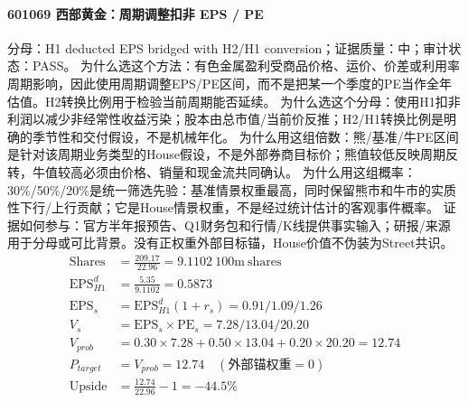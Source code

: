 \paragraph{601069 西部黄金：周期调整扣非 EPS / PE}
分母：H1 deducted EPS bridged with H2/H1 conversion；证据质量：中；审计状态：PASS。
为什么选这个方法：有色金属盈利受商品价格、运价、价差或利用率周期影响，因此使用周期调整EPS/PE区间，而不是把某一个季度的PE当作全年估值。H2转换比例用于检验当前周期能否延续。
为什么选这个分母：使用H1扣非利润以减少非经常性收益污染；股本由总市值/当前价反推；H2/H1转换比例是明确的季节性和交付假设，不是机械年化。
为什么用这组倍数：熊/基准/牛PE区间是针对该周期业务类型的House假设，不是外部券商目标价；熊值较低反映周期反转，牛值较高必须由价格、销量和现金流共同确认。
为什么用这组概率：30\%/50\%/20\%是统一筛选先验：基准情景权重最高，同时保留熊市和牛市的实质性下行/上行贡献；它是House情景权重，不是经过统计估计的客观事件概率。
证据如何参与：官方半年报预告、Q1财务包和行情/K线提供事实输入；研报/来源用于分母或可比背景。没有正权重外部目标锚，House价值不伪装为Street共识。
\begin{align*}
\mathrm{Shares} &= \frac{209.17}{22.96}=9.1102\ \mathrm{100m\ shares}\\
\mathrm{EPS}_{H1}^d &= \frac{5.35}{9.1102}=0.5873\\
\mathrm{EPS}_s &= \mathrm{EPS}_{H1}^d(1+r_s)=0.91/1.09/1.26\\
V_s &= \mathrm{EPS}_s\times \mathrm{PE}_s=7.28/13.04/20.20\\
V_{prob} &= 0.30\times 7.28+0.50\times 13.04+0.20\times 20.20=12.74\\
P_{target} &= V_{prob}=12.74\quad(\text{外部锚权重}=0)\\
\mathrm{Upside} &= \frac{12.74}{22.96}-1=-44.5\%\\
\end{align*}

